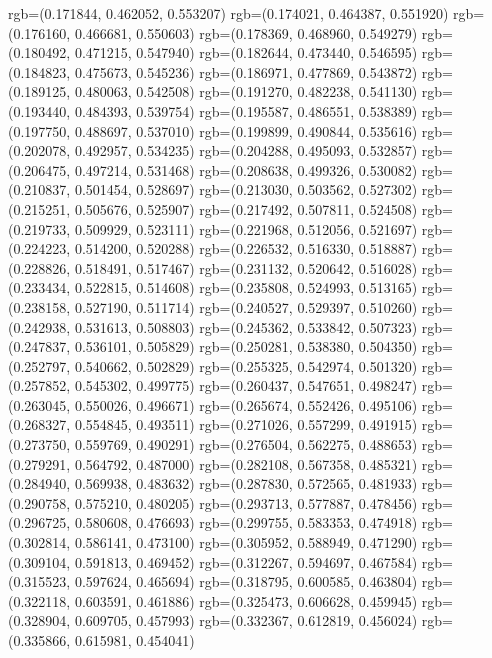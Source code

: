 {{{					rgb=(0.171844, 0.462052, 0.553207)
					rgb=(0.174021, 0.464387, 0.551920)
					rgb=(0.176160, 0.466681, 0.550603)
					rgb=(0.178369, 0.468960, 0.549279)
					rgb=(0.180492, 0.471215, 0.547940)
					rgb=(0.182644, 0.473440, 0.546595)
					rgb=(0.184823, 0.475673, 0.545236)
					rgb=(0.186971, 0.477869, 0.543872)
					rgb=(0.189125, 0.480063, 0.542508)
					rgb=(0.191270, 0.482238, 0.541130)
					rgb=(0.193440, 0.484393, 0.539754)
					rgb=(0.195587, 0.486551, 0.538389)
					rgb=(0.197750, 0.488697, 0.537010)
					rgb=(0.199899, 0.490844, 0.535616)
					rgb=(0.202078, 0.492957, 0.534235)
					rgb=(0.204288, 0.495093, 0.532857)
					rgb=(0.206475, 0.497214, 0.531468)
					rgb=(0.208638, 0.499326, 0.530082)
					rgb=(0.210837, 0.501454, 0.528697)
					rgb=(0.213030, 0.503562, 0.527302)
					rgb=(0.215251, 0.505676, 0.525907)
					rgb=(0.217492, 0.507811, 0.524508)
					rgb=(0.219733, 0.509929, 0.523111)
					rgb=(0.221968, 0.512056, 0.521697)
					rgb=(0.224223, 0.514200, 0.520288)
					rgb=(0.226532, 0.516330, 0.518887)
					rgb=(0.228826, 0.518491, 0.517467)
					rgb=(0.231132, 0.520642, 0.516028)
					rgb=(0.233434, 0.522815, 0.514608)
					rgb=(0.235808, 0.524993, 0.513165)
					rgb=(0.238158, 0.527190, 0.511714)
					rgb=(0.240527, 0.529397, 0.510260)
					rgb=(0.242938, 0.531613, 0.508803)
					rgb=(0.245362, 0.533842, 0.507323)
					rgb=(0.247837, 0.536101, 0.505829)
					rgb=(0.250281, 0.538380, 0.504350)
					rgb=(0.252797, 0.540662, 0.502829)
					rgb=(0.255325, 0.542974, 0.501320)
					rgb=(0.257852, 0.545302, 0.499775)
					rgb=(0.260437, 0.547651, 0.498247)
					rgb=(0.263045, 0.550026, 0.496671)
					rgb=(0.265674, 0.552426, 0.495106)
					rgb=(0.268327, 0.554845, 0.493511)
					rgb=(0.271026, 0.557299, 0.491915)
					rgb=(0.273750, 0.559769, 0.490291)
					rgb=(0.276504, 0.562275, 0.488653)
					rgb=(0.279291, 0.564792, 0.487000)
					rgb=(0.282108, 0.567358, 0.485321)
					rgb=(0.284940, 0.569938, 0.483632)
					rgb=(0.287830, 0.572565, 0.481933)
					rgb=(0.290758, 0.575210, 0.480205)
					rgb=(0.293713, 0.577887, 0.478456)
					rgb=(0.296725, 0.580608, 0.476693)
					rgb=(0.299755, 0.583353, 0.474918)
					rgb=(0.302814, 0.586141, 0.473100)
					rgb=(0.305952, 0.588949, 0.471290)
					rgb=(0.309104, 0.591813, 0.469452)
					rgb=(0.312267, 0.594697, 0.467584)
					rgb=(0.315523, 0.597624, 0.465694)
					rgb=(0.318795, 0.600585, 0.463804)
					rgb=(0.322118, 0.603591, 0.461886)
					rgb=(0.325473, 0.606628, 0.459945)
					rgb=(0.328904, 0.609705, 0.457993)
					rgb=(0.332367, 0.612819, 0.456024)
					rgb=(0.335866, 0.615981, 0.454041)
}}}
